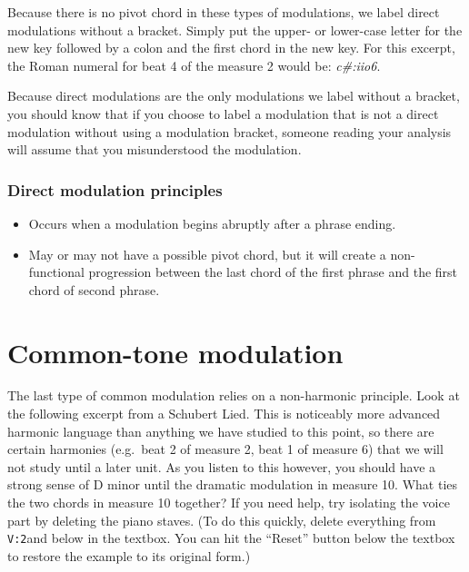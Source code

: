 \documentclass{book}
\providecommand{\tightlist}{%
  \setlength{\itemsep}{0pt}\setlength{\parskip}{0pt}}
\begin{document}
Because there is no pivot chord in these types of modulations, we label direct
modulations without a bracket. Simply put the upper- or lower-case letter for
the new key followed by a colon and the first chord in the new key. For this
excerpt, the Roman numeral for beat 4 of the measure 2 would be:
\emph{c\#:iio6}.

Because direct modulations are the only modulations we label without a
bracket, you should know that if you choose to label a modulation that is not
a direct modulation without using a modulation bracket, someone reading your
analysis will assume that you misunderstood the modulation.

\hypertarget{direct-modulation-principles}{%
\subsubsection{Direct modulation
principles}\label{direct-modulation-principles}}

\begin{itemize}
\tightlist
\item
  Occurs when a modulation begins abruptly after a phrase ending.
\item
  May or may not have a possible pivot chord, but it will create a
  non-functional progression between the last chord of the first phrase and
  the first chord of second phrase.
\end{itemize}

\hypertarget{common-tone-modulation}{%
\section{Common-tone modulation}\label{common-tone-modulation}}

The last type of common modulation relies on a non-harmonic principle. Look at
the following excerpt from a Schubert Lied. This is noticeably more advanced
harmonic language than anything we have studied to this point, so there are
certain harmonies (e.g.~beat 2 of measure 2, beat 1 of measure 6) that we will
not study until a later unit. As you listen to this however, you should have a
strong sense of D minor until the dramatic modulation in measure 10. What ties
the two chords in measure 10 together? If you need help, try isolating the
voice part by deleting the piano staves. (To do this quickly, delete
everything from \texttt{V:2}and below in the textbox. You can hit the
``Reset'' button below the textbox to restore the example to its original
form.)
\end{document}
